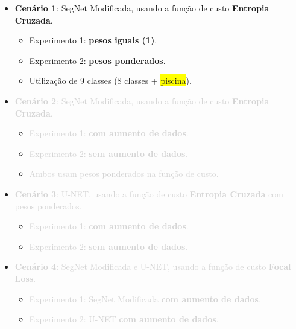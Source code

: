 \documentclass[%
  10pt,%
  aspectratio = 169,%
  compress,%
  t,%
  english,%
  brazilian,%
  tikz,
]{beamer}
\begin{document}
\begin{frame}

\begin{itemize}
    \item \textbf{Cenário 1}: SegNet Modificada, usando a função de custo \textbf{Entropia Cruzada}.
    \begin{itemize}
        \item Experimento 1: \textbf{pesos iguais (1)}.
        \item Experimento 2: \textbf{pesos ponderados}. 
        \item Utilização de 9 classes (8 classes + \colorbox{yellow}{piscina}).
    \end{itemize}
\end{itemize}
\begin{itemize}
    \item \textcolor{lightgray}{\textbf{Cenário 2}: SegNet Modificada, usando a função de custo \textbf{Entropia Cruzada}.}
    \begin{itemize}
        \item \textcolor{lightgray}{Experimento 1: \textbf{com aumento de dados}.}
        \item \textcolor{lightgray}{Experimento 2: \textbf{sem aumento de dados}.}
        \item \textcolor{lightgray}{Ambos usam pesos ponderados na função de custo.}
    \end{itemize}
\end{itemize}
\begin{itemize}
    \item \textcolor{lightgray}{\textbf{Cenário 3}: U-NET, usando a função de custo \textbf{Entropia Cruzada} com pesos ponderados.}
    \begin{itemize}
        \item \textcolor{lightgray}{Experimento 1: \textbf{com aumento de dados}.}
        \item \textcolor{lightgray}{Experimento 2: \textbf{sem aumento de dados}.}
    \end{itemize}
\end{itemize}
\begin{itemize}
    \item \textcolor{lightgray}{\textbf{Cenário 4}: SegNet Modificada e U-NET, usando a função de custo \textbf{Focal Loss}.}
    \begin{itemize}
        \item \textcolor{lightgray}{Experimento 1: SegNet Modificada \textbf{com aumento de dados}.}
        \item \textcolor{lightgray}{Experimento 2: U-NET \textbf{com aumento de dados}.}
    \end{itemize}
\end{itemize}

\end{frame}
\end{document}
